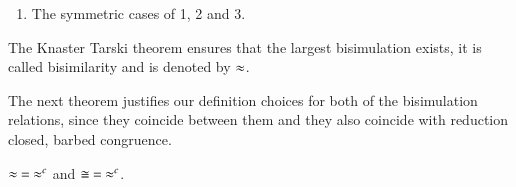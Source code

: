 \begin{definition}[Bisimulation]
\begin{enumerate}
		\item	The symmetric cases of 1, 2 and 3.
	\end{enumerate}
	The Knaster Tarski theorem ensures that the largest bisimulation exists, it is called bisimilarity and is denoted by $\approx$.
\end{definition}

The next theorem justifies our definition choices
for both of the bisimulation relations, since
they coincide between them and they also
coincide with reduction closed, barbed congruence.

\begin{theorem}[Coincidence]\rm
	$\approx\ =\ \approx^{c}$ and $\cong\ =\ \approx^{c}$.
\end{theorem}


